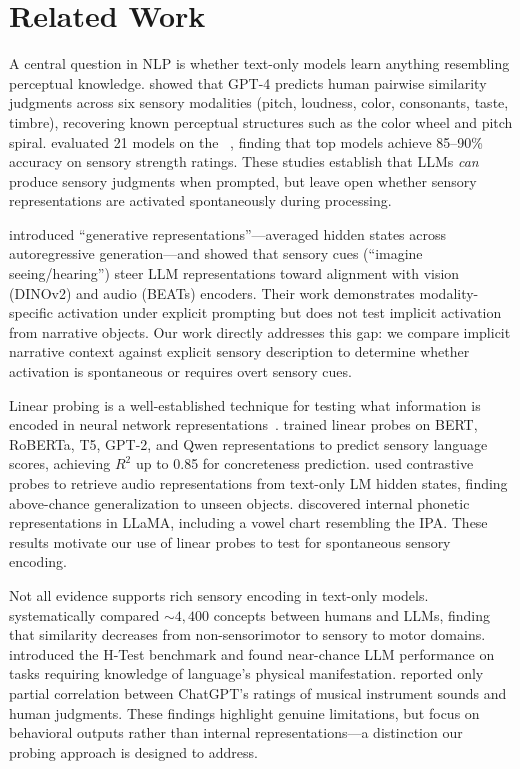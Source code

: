 \section{Related Work}
\label{sec:related}

A central question in NLP is whether text-only models learn anything resembling perceptual knowledge. \citet{marjieh2023large} showed that GPT-4 predicts human pairwise similarity judgments across six sensory modalities (pitch, loudness, color, consonants, taste, timbre), recovering known perceptual structures such as the color wheel and pitch spiral. \citet{lee2025exploring} evaluated 21 models on the \lancaster~\citep{lynott2020lancaster}, finding that top models achieve 85--90\% accuracy on sensory strength ratings. These studies establish that LLMs \emph{can} produce sensory judgments when prompted, but leave open whether sensory representations are activated spontaneously during processing.

\citet{wang2025words} introduced ``generative representations''---averaged hidden states across autoregressive generation---and showed that sensory cues (``imagine seeing/hearing'') steer LLM representations toward alignment with vision (DINOv2) and audio (BEATs) encoders. Their work demonstrates modality-specific activation under explicit prompting but does not test implicit activation from narrative objects. Our work directly addresses this gap: we compare implicit narrative context against explicit sensory description to determine whether activation is spontaneous or requires overt sensory cues.

Linear probing is a well-established technique for testing what information is encoded in neural network representations~\citep{alain2017understanding, belinkov2022probing}. \citet{hicke2025zero} trained linear probes on BERT, RoBERTa, T5, GPT-2, and Qwen representations to predict sensory language scores, achieving $R^2$ up to 0.85 for concreteness prediction. \citet{ngo2024what} used contrastive probes to retrieve audio representations from text-only LM hidden states, finding above-chance generalization to unseen objects. \citet{merullo2025mouth} discovered internal phonetic representations in LLaMA, including a vowel chart resembling the IPA. These results motivate our use of linear probes to test for spontaneous sensory encoding.

Not all evidence supports rich sensory encoding in text-only models. \citet{xu2025large} systematically compared ${\sim}4{,}400$ concepts between humans and LLMs, finding that similarity decreases from non-sensorimotor to sensory to motor domains. \citet{lee2024language} introduced the H-Test benchmark and found near-chance LLM performance on tasks requiring knowledge of language's physical manifestation. \citet{siedenburg2023language} reported only partial correlation between ChatGPT's ratings of musical instrument sounds and human judgments. These findings highlight genuine limitations, but focus on behavioral outputs rather than internal representations---a distinction our probing approach is designed to address.

